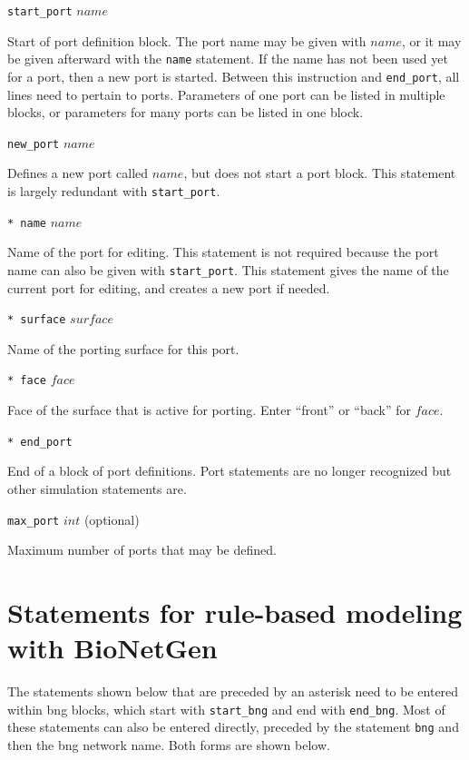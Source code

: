 \documentclass {book}
\newcommand {\ttt} {\texttt}
\begin{document}
\begin{description}

\item{\ttt{start\_port} $name$}

Start of port definition block. The port name may be given with $name$, or it may be given afterward with the \ttt{name} statement. If the name has not been used yet for a port, then a new port is started. Between this instruction and \ttt{end\_port}, all lines need to pertain to ports. Parameters of one port can be listed in multiple blocks, or parameters for many ports can be listed in one block.

\item{\ttt{new\_port} $name$}

Defines a new port called $name$, but does not start a port block. This statement is largely redundant with \ttt{start\_port}.

\item{\ttt{* name} $name$}

Name of the port for editing. This statement is not required because the port name can also be given with \ttt{start\_port}. This statement gives the name of the current port for editing, and creates a new port if needed.

\item{\ttt{* surface} $surface$}

Name of the porting surface for this port.

\item{\ttt{* face} $face$}

Face of the surface that is active for porting. Enter ``front'' or ``back'' for $face$.

\item{\ttt{* end\_port}}

End of a block of port definitions. Port statements are no longer recognized but other simulation statements are.

\item{\ttt{max\_port} $int$} (optional)

Maximum number of ports that may be defined.

\end{description}

\section{Statements for rule-based modeling with BioNetGen}

The statements shown below that are preceded by an asterisk need to be entered within bng blocks, which start with \ttt{start\_bng} and end with \ttt{end\_bng}. Most of these statements can also be entered directly, preceded by the statement \ttt{bng} and then the bng network name. Both forms are shown below.
\end{document}
